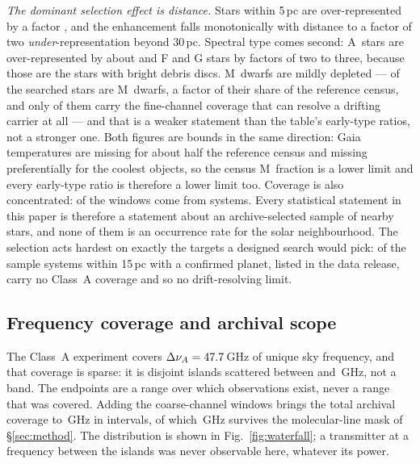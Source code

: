 \emph{The dominant selection effect is distance.} Stars within 5\,pc are
over-represented by a factor \SfTopRatio, and the enhancement falls
monotonically with distance to a factor of two \emph{under}-representation
beyond 30\,pc. Spectral type comes second: A~stars are over-represented by
about \SfARatio{} and F and G stars by factors of two to three, because those
are the stars with bright debris discs. M~dwarfs are mildly depleted ---
\SfMSearched{} of the \SfNStar{} searched stars are M~dwarfs, a factor
\SfMRatio{} of their share of the reference census, and only
\SfMClassAStars{} of them carry the fine-channel coverage that can resolve a
drifting carrier at all --- and that is a weaker
statement than the table's early-type ratios, not a stronger one. Both
figures are bounds in the same direction: Gaia temperatures are missing for
about half the reference census and missing preferentially for the coolest
objects, so the census M~fraction is a lower limit and every early-type ratio
is therefore a lower limit too. Coverage is also concentrated:
\ConcThreeWin{} of the \NWindows{} windows come from \ConcThreeSys{}
systems. Every statistical statement in this paper is therefore a statement
about an archive-selected sample of nearby stars, and none of them is an
occurrence rate for the solar neighbourhood. The selection acts hardest on
exactly the targets a designed search would pick: of the \CsIntNRow{} sample
systems within 15\,pc with a confirmed planet, listed in the data release,
\CsIntNoClassA{} carry no Class~A coverage and so no drift-resolving limit.




\subsection{Frequency coverage and archival scope}
\label{sec:coverage}

The Class~A experiment covers $\Delta\nu_A=47.7$\,GHz of unique sky
frequency, and that coverage is sparse: it is \DomAIslands{} disjoint islands
scattered between \DomAFreqLo{} and \DomAFreqHi\,GHz, not a band. The
endpoints are a range over which observations exist, never a range that was
covered. Adding the coarse-channel windows brings the total archival coverage
to \DnuAB\,GHz in \UnionIntervals{} intervals, of which \SearchedUnionGHz\,GHz
survives the molecular-line mask of \S\ref{sec:method}. The distribution is
shown in Fig.~\ref{fig:waterfall}; a transmitter at a frequency between the
islands was never observable here, whatever its power.

